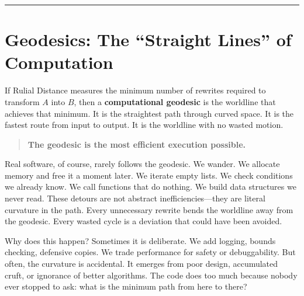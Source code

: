 \begin{center}
\rule{0.5\linewidth}{0.5pt}
\end{center}

\section{Geodesics: The ``Straight Lines'' of Computation}
\label{6.4-geodesics}

If Rulial Distance measures the minimum number of rewrites required to transform $A$ into $B$, then a
\textbf{computational geodesic} is the worldline that achieves that minimum. It is the straightest
path through curved space. It is the fastest route from input to output. It is the worldline with no
wasted motion.

\begin{quote}
\textbf{The geodesic is the most efficient execution possible.}
\end{quote}

Real software, of course, rarely follows the geodesic. We wander. We allocate memory and free it a
moment later. We iterate empty lists. We check conditions we already know. We call functions that do
nothing. We build data structures we never read. These detours are not abstract inefficiencies—they
are literal curvature in the path. Every unnecessary rewrite bends the worldline away from the
geodesic. Every wasted cycle is a deviation that could have been avoided.

Why does this happen? Sometimes it is deliberate. We add logging, bounds checking, defensive copies.
We trade performance for safety or debuggability. But often, the curvature is accidental. It emerges
from poor design, accumulated cruft, or ignorance of better algorithms. The code does too much
because nobody ever stopped to ask: what is the minimum path from here to there?

